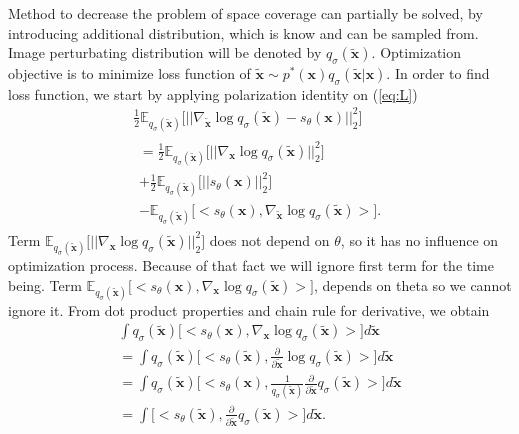 \documentclass[10pt]{article}
\begin{document}
Method to decrease the problem of space coverage can partially be solved, by introducing additional distribution, which is know and can be sampled from. Image perturbating distribution  will be denoted by $q_{\sigma}( \tilde{\textbf{x}} )$. Optimization objective is to minimize loss function of $ \tilde{\textbf{x} } \sim p^*(\textbf{x})q_{\sigma}( \tilde{\textbf{x}} | \textbf{x})$. In order to find loss function, we start by applying polarization identity on (\ref{eq:L})
\begin{gather}
    \frac{1}{2}\mathbb{E}_{q_{\sigma}( \tilde{\textbf{x}} )} \Big[ ||\nabla_{ \tilde{\textbf{x}}} \log q_{\sigma}( \tilde{\textbf{x} })
    - s_{\theta}(\textbf{x})||_2^2 \Big] \\
    \begin{gathered}
     = \label{eq:sm_loss_nontransfromed} 
     \frac{1}{2}\mathbb{E}_{q_{\sigma}( \tilde{\textbf{x}} )} \Big[ ||\nabla_{\textbf{x}} \log q_{\sigma}( \tilde{\textbf{x} }) ||_2^2 \Big] \\
    + \frac{1}{2}\mathbb{E}_{q_{\sigma}( \tilde{\textbf{x}} ) } \Big[ ||  s_{\theta}(\textbf{x})||_2^2 \Big] \\ 
    -  \mathbb{E}_{q_{\sigma}( \tilde{\textbf{x}} ) } \Big[ < s_{\theta}(\textbf{x}), 
    \nabla_{ \tilde{\textbf{x}}} \log q_{\sigma}( \tilde{\textbf{x}})  >  \Big]. 
    \end{gathered}
\end{gather}
Term $ \mathbb{E}_{q_{\sigma}( \tilde{\textbf{x}} ) } \Big[ ||\nabla_{\textbf{x}} \log q_{\sigma}( \tilde{\textbf{x} }) ||_2^2 \Big]$ does not depend on $\theta$, so it has no influence on optimization process. Because  of that fact we will ignore first term for the time being. 
Term $\mathbb{E}_{q_{\sigma}( \tilde{\textbf{x}} ) } \Big[ < s_{\theta}(\textbf{x}), 
    \nabla_{\textbf{x}} \log q_{\sigma}( \tilde{\textbf{x}})  >  \Big]$, depends on theta so we cannot ignore it. From dot product properties and chain rule for derivative, we obtain
\begin{gather}
    \int q_{\sigma}( \tilde{\textbf{x} })  \Big[ < s_{\theta}(\textbf{x}), 
    \nabla_{\textbf{x}} \log q_{\sigma}( \tilde{\textbf{x}})  >  \Big] d \tilde{\textbf{x} } \\
    =  \int q_{\sigma}( \tilde{\textbf{x} })  \Big[ < s_{\theta}(\tilde{\textbf{x}}), 
   \frac{\partial} {\partial \tilde{\textbf{x}}} \log q_{\sigma}( \tilde{\textbf{x}})  >  \Big] d\tilde{\textbf{x}} \\
   = \int q_{\sigma}( \tilde{\textbf{x} })  \Big[ < s_{\theta}(\textbf{x}), 
    \frac{1}{ q_{\sigma}( \tilde{\textbf{x}})}\frac{\partial} {\partial \tilde{\textbf{x}}} q_{\sigma}( \tilde{\textbf{x}})  >  \Big] d\tilde{\textbf{x}} \\
    =\int  \Big[ < s_{\theta}(\tilde{\textbf{x}}), 
    \frac{\partial} {\partial \tilde{\textbf{x}}} q_{\sigma}( \tilde{\textbf{x}})  >  \Big] d\tilde{\textbf{x}}.
\end{gather}
\end{document}
